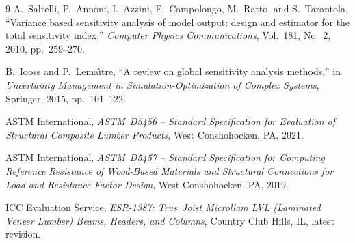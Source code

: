 \documentclass[10pt,twocolumn]{article}
\begin{document}
\begin{thebibliography}{9}
A.~Saltelli, P.~Annoni, I.~Azzini, F.~Campolongo, M.~Ratto, and
S.~Tarantola,
``Variance based sensitivity analysis of model output: design and
  estimator for the total sensitivity index,''
\textit{Computer Physics Communications}, Vol.~181, No.~2, 2010,
pp.~259--270.

B.~Iooss and P.~Lema\^{\i}tre,
``A review on global sensitivity analysis methods,''
in \textit{Uncertainty Management in Simulation-Optimization of
  Complex Systems}, Springer, 2015, pp.~101--122.

ASTM International, \textit{ASTM~D5456 -- Standard Specification for
Evaluation of Structural Composite Lumber Products}, West Conshohocken,
PA, 2021.

ASTM International, \textit{ASTM~D5457 -- Standard Specification for
Computing Reference Resistance of Wood-Based Materials and Structural
Connections for Load and Resistance Factor Design}, West Conshohocken,
PA, 2019.

ICC Evaluation Service, \textit{ESR-1387: Trus~Joist Microllam LVL
(Laminated Veneer Lumber) Beams, Headers, and Columns}, Country Club Hills,
IL, latest revision.

\end{thebibliography}
\end{document}
